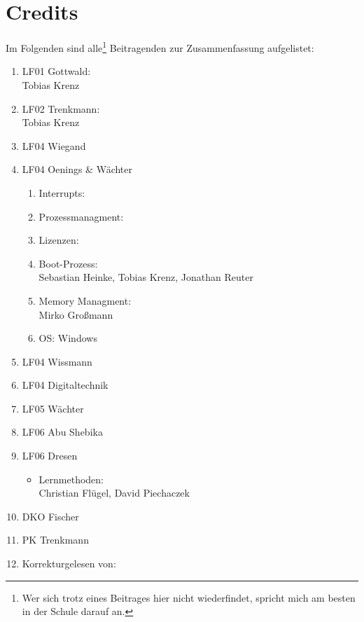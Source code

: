 \section{Credits}
Im Folgenden sind alle\footnote{Wer sich trotz eines Beitrages hier nicht wiederfindet, spricht mich am besten in der Schule darauf an.} Beitragenden zur Zusammenfassung aufgelistet:

\begin{enumerate}
	\item LF01 Gottwald:\\
Tobias Krenz
	\item LF02 Trenkmann:\\
Tobias Krenz
	\item LF04 Wiegand
	\item LF04 Oenings \& Wächter
	\begin{enumerate}
		\item Interrupts:
		\item Prozessmanagment:
		\item Lizenzen:
		\item Boot-Prozess:\\
Sebastian Heinke, Tobias Krenz, Jonathan Reuter
		\item Memory Managment:\\
Mirko Großmann
		\item OS: Windows
	\end{enumerate}
	\item LF04 Wissmann
	\item LF04 Digitaltechnik
	\item LF05 Wächter
	\item LF06 Abu Shebika
	\item LF06 Dresen
	\begin{itemize}
		\item Lernmethoden:\\
Christian Flügel, David Piechaczek
	\end{itemize}
	\item DKO Fischer
	\item PK Trenkmann
	\item Korrekturgelesen von:
\end{enumerate}